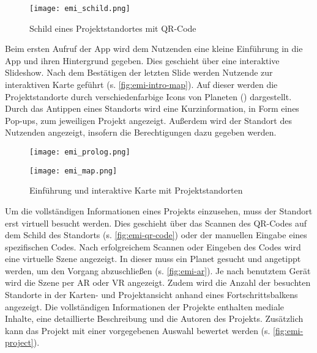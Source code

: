 
\begin{figure}[htpb]
    \centering
    \texttt{[image: emi\_schild.png]}
    \caption{Schild eines Projektstandortes mit QR-Code}
    \label{fig:emi-qr-code}
\end{figure}

Beim ersten Aufruf der App wird dem Nutzenden eine kleine Einführung in die App
und ihren Hintergrund gegeben. Dies geschieht über eine interaktive Slideshow.
Nach dem Bestätigen der letzten Slide werden Nutzende zur interaktiven Karte
geführt (s. \autoref{fig:emi-intro-map}). Auf dieser werden die Projektstandorte
durch verschiedenfarbige Icons von Planeten ()
dargestellt. Durch das Antippen eines Standorts wird eine Kurzinformation, in
Form eines Pop-ups, zum jeweiligen Projekt angezeigt. Außerdem wird der
Standort des Nutzenden angezeigt, insofern die Berechtigungen dazu gegeben
werden.

\begin{figure}[htpb]
    \begin{minipage}{.5\textwidth}
        \centering
        \texttt{[image: emi\_prolog.png]}
    \end{minipage}%
    \begin{minipage}{.5\textwidth}
        \centering
        \texttt{[image: emi\_map.png]}
    \end{minipage}
    \caption{Einführung und interaktive Karte mit Projektstandorten}
    \label{fig:emi-intro-map}
\end{figure}

Um die vollständigen Informationen eines Projekts einzusehen, muss der
Standort erst virtuell besucht werden. Dies geschieht über das Scannen des
QR-Codes auf dem Schild des Standorts (s. \autoref{fig:emi-qr-code}) oder der
manuellen Eingabe eines spezifischen Codes. Nach erfolgreichem Scannen oder
Eingeben des Codes wird eine virtuelle Szene angezeigt. In dieser muss ein
Planet gesucht und angetippt werden, um den Vorgang abzuschließen (s.
\autoref{fig:emi-ar}). Je nach benutztem Gerät wird die Szene per \ac{AR} oder \ac{VR} angezeigt. Zudem wird die Anzahl der
besuchten Standorte in der Karten- und Projektansicht anhand eines
Fortschrittsbalkens angezeigt. Die vollständigen Informationen der Projekte
enthalten mediale Inhalte, eine detaillierte Beschreibung und die Autoren des
Projekts. Zusätzlich kann das Projekt mit einer vorgegebenen Auswahl bewertet
werden (s. \autoref{fig:emi-project}).

